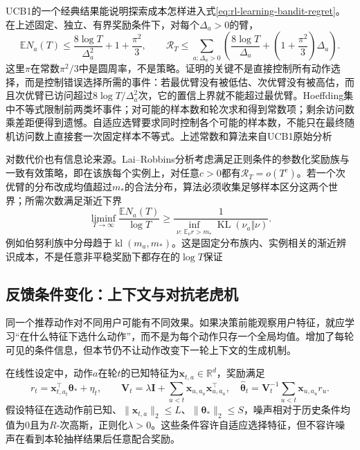 UCB1的一个经典结果能说明探索成本怎样进入式\eqref{eq:rl-learning-bandit-regret}。在上述固定、独立、有界奖励条件下，对每个$\Delta_a>0$的臂，
\begin{equation}
  \mathbb E N_a(T)
  \leq \frac{8\log T}{\Delta_a^2}+1+\frac{\pi^2}{3},
  \qquad
  \mathcal R_T
  \leq\sum_{a:\Delta_a>0}
    \left(\frac{8\log T}{\Delta_a}
    +\left(1+\frac{\pi^2}{3}\right)\Delta_a\right).
  \label{eq:rl-learning-ucb-bound}
\end{equation}
这里$\pi$在常数$\pi^2/3$中是圆周率，不是策略。证明的关键不是直接控制所有动作选择，而是控制错误选择所需的事件：若最优臂没有被低估、次优臂没有被高估，而且次优臂已访问超过$8\log T/\Delta_a^2$次，它的置信上界就不能超过最优臂。Hoeffding集中不等式限制前两类坏事件；对可能的样本数和轮次求和得到常数项；剩余访问数乘差距便得到遗憾。自适应选臂要求同时控制各个可能的样本数，不能只在最终随机访问数上直接套一次固定样本不等式。上述常数和算法来自UCB1原始分析

对数代价也有信息论来源。Lai--Robbins分析考虑满足正则条件的参数化奖励族与一致有效策略，即在该族每个实例上，对任意$c>0$都有$\mathcal R_T=o(T^c)$。若一个次优臂的分布改成均值超过$m_*$的合法分布，算法必须收集足够样本区分这两个世界；所需次数满足渐近下界
\[
  \liminf_{T\to\infty}\frac{\mathbb E N_a(T)}{\log T}
  \geq
  \frac{1}{\inf_{\nu:\,\mathbb E_\nu r>m_*}
                \operatorname{KL}(\nu_a\Vert\nu)}.
\]
例如伯努利族中分母趋于$\operatorname{kl}(m_a,m_*)$。这是固定分布族内、实例相关的渐近辨识成本，不是任意非平稳奖励下都存在的$\log T$保证

\subsection{反馈条件变化：上下文与对抗老虎机}
\label{sec:rl-learning-contextual}

同一个推荐动作对不同用户可能有不同效果。如果决策前能观察用户特征，就应学习“在什么特征下选什么动作”，而不是为每个动作只存一个全局均值。增加了每轮可见的条件信息，但本节仍不让动作改变下一轮上下文的生成机制。

在线性设定中，动作$a$在轮$t$的已知特征为$\bm{x}_{t,a}\in\mathbb R^d$，奖励满足
\begin{equation}
  r_t=\bm{x}_{t,a_t}^{\top}\bm{\theta}_*+\eta_t,\qquad
  \bm{V}_t=\lambda\bm{I}+\sum_{u<t}\bm{x}_{u,a_u}\bm{x}_{u,a_u}^{\top},
  \quad
  \widehat{\bm{\theta}}_t
  =\bm{V}_t^{-1}\sum_{u<t}\bm{x}_{u,a_u}r_u .
  \label{eq:rl-learning-linear-bandit}
\end{equation}
假设特征在选动作前已知、$\lVert\bm{x}_{t,a}\rVert_2\leq L$、$\lVert\bm{\theta}_*\rVert_2\leq S$，噪声相对于历史条件均值为0且为$R$-次高斯，正则化$\lambda>0$。这些条件容许自适应选择特征，但不容许噪声在看到本轮抽样结果后任意配合奖励。

